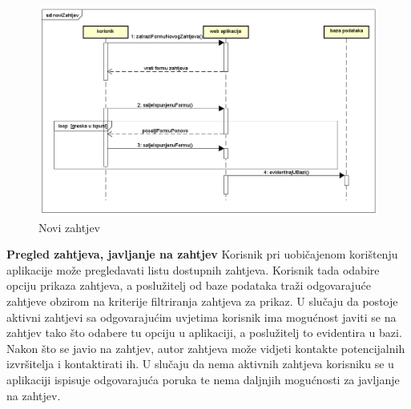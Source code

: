 				\newpage
				\begin{figure}[H]
					\includegraphics[scale=0.5]{slike/novi-zahtjev.png} %
					\centering
					\caption{Novi zahtjev}
				\end{figure}
				\newpage
				
				\noindent \large {\textbf{Pregled zahtjeva, javljanje na zahtjev}}
				\newline
				\noindent \normalsize Korisnik pri uobičajenom korištenju aplikacije može pregledavati listu dostupnih zahtjeva. Korisnik tada odabire opciju prikaza zahtjeva, a poslužitelj od baze podataka traži odgovarajuće zahtjeve obzirom na kriterije filtriranja zahtjeva za prikaz. U slučaju da postoje aktivni zahtjevi sa odgovarajućim uvjetima korisnik ima mogućnost javiti se na zahtjev tako što odabere tu opciju u aplikaciji, a poslužitelj to evidentira u bazi. Nakon što se javio na zahtjev, autor zahtjeva može vidjeti kontakte potencijalnih izvršitelja i kontaktirati ih. U slučaju da nema aktivnih zahtjeva korisniku se u aplikaciji ispisuje odgovarajuća poruka te nema daljnjih mogućnosti za javljanje na zahtjev. 
				   
